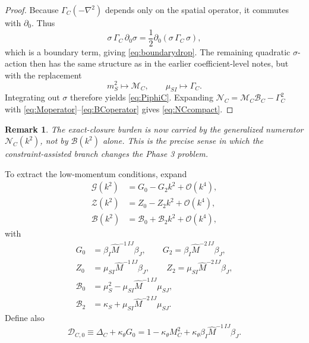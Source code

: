 \documentclass[11pt]{article}
\newtheorem{remark}{Remark}
\begin{document}
\begin{proof}
Because \(\Gamma_C(-\nabla^2)\) depends only on the spatial operator, it commutes with \(\partial_0\). Thus
\[
\sigma\,\Gamma_C\,\partial_0\sigma
=
\frac{1}{2}\partial_0\!\left(\sigma\,\Gamma_C\,\sigma\right),
\]
which is a boundary term, giving \eqref{eq:boundarydrop}. The remaining quadratic \(\sigma\)-action then has the same structure as in the earlier coefficient-level notes, but with the replacement
\[
m_S^2\mapsto \mathcal M_C,
\qquad
\mu_{SI}\mapsto \Gamma_C.
\]
Integrating out \(\sigma\) therefore yields \eqref{eq:PiphiC}. Expanding \(\mathcal N_C=\mathcal M_C\mathcal B_C-\Gamma_C^2\) with \eqref{eq:Moperator}--\eqref{eq:BCoperator} gives \eqref{eq:NCcompact}.
\end{proof}

\begin{remark}
The exact-closure burden is now carried by the generalized numerator \(\mathcal N_C(k^2)\), not by \(\mathcal B(k^2)\) alone. This is the precise sense in which the constraint-assisted branch changes the Phase 3 problem.
\end{remark}

To extract the low-momentum conditions, expand
\begin{align}
\mathcal G(k^2)
&=
G_0-G_2k^2+\mathcal O(k^4),
\label{eq:Gexpand}
\\
\mathcal Z(k^2)
&=
Z_0-Z_2k^2+\mathcal O(k^4),
\label{eq:Zexpand}
\\
\mathcal B(k^2)
&=
\mathcal B_0+\mathcal B_2k^2+\mathcal O(k^4),
\label{eq:Bexpand}
\end{align}
with
\begin{align}
G_0
&=
\beta_I\widehat M^{-1\,IJ}\beta_J,
\qquad
G_2
=
\beta_I\widehat M^{-2\,IJ}\beta_J,
\label{eq:Gcoeffs}
\\
Z_0
&=
\mu_{SI}\widehat M^{-1\,IJ}\beta_J,
\qquad
Z_2
=
\mu_{SI}\widehat M^{-2\,IJ}\beta_J,
\label{eq:Zcoeffs}
\\
\mathcal B_0
&=
\mu_S^2-\mu_{SI}\widehat M^{-1\,IJ}\mu_{SJ},
\label{eq:B0}
\\
\mathcal B_2
&=
\kappa_S+\mu_{SI}\widehat M^{-2\,IJ}\mu_{SJ}.
\label{eq:B2}
\end{align}
Define also
\begin{equation}
\mathcal D_{C,0}
\equiv
\Delta_C+\kappa_\theta G_0
=
1-\kappa_\theta M_C^2+\kappa_\theta\beta_I\widehat M^{-1\,IJ}\beta_J.
\label{eq:DC0}
\end{equation}
\end{document}
